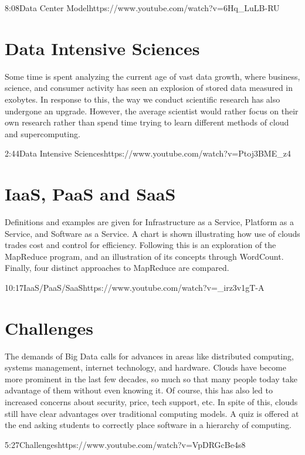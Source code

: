   {8:08}{Data Center Model}{https://www.youtube.com/watch?v=6Hq_LuLB-RU}


\section{Data Intensive Sciences}

Some time is spent analyzing the current age of vast data growth, where
business, science, and consumer activity has seen an explosion of stored
data measured in exobytes. In response to this, the way we conduct
scientific research has also undergone an upgrade. However, the average
scientist would rather focus on their own research rather than spend
time trying to learn different methods of cloud and supercomputing.

  {2:44}{Data Intensive Sciences}{https://www.youtube.com/watch?v=Ptoj3BME_z4}


\section{IaaS, PaaS and SaaS}

Definitions and examples are given for Infrastructure as a Service,
Platform as a Service, and Software as a Service. A chart is shown
illustrating how use of clouds trades cost and control for efficiency.
Following this is an exploration of the MapReduce program, and an
illustration of its concepts through WordCount. Finally, four distinct
approaches to MapReduce are compared.

  {10:17}{IaaS/PaaS/SaaS}{https://www.youtube.com/watch?v=_irz3v1gT-A}


\section{Challenges}

The demands of Big Data calls for advances in areas like distributed
computing, systems management, internet technology, and hardware. Clouds
have become more prominent in the last few decades, so much so that many
people today take advantage of them without even knowing it. Of course,
this has also led to increased concerns about security, price, tech
support, etc. In spite of this, clouds still have clear advantages over
traditional computing models. A quiz is offered at the end asking
students to correctly place software in a hierarchy of computing.

  {5:27}{Challenges}{https://www.youtube.com/watch?v=VpDRGcBe4s8}

